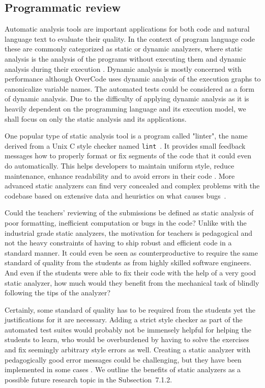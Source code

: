 \subsection{Programmatic review}

Automatic analysis tools are important applications for both code and natural language text to evaluate their quality. In the context of program language code these are commonly categorized as static or dynamic analyzers, where static analysis is the analysis of the programs without executing them and dynamic analysis during their execution \cite{static-dynamic-hybrid-analysis}. Dynamic analysis is mostly concerned with performance although OverCode uses dynamic analysis of the execution graphs to canonicalize variable names\cite{overcode}. The automated tests could be considered as a form of dynamic analysis. Due to the difficulty of applying dynamic analysis as it is heavily dependent on the programming language and its execution model, we shall focus on only the static analysis and its applications.

One popular type of static analysis tool is a program called "linter", the name derived from a Unix C style checker named \texttt{lint}~\cite{lint-1988}. It provides small feedback messages how to properly format or fix segments of the code that it could even do automatically. This helps developers to maintain uniform style, reduce maintenance, enhance readability and to avoid errors in their code \cite{lint-1988}. More advanced static analyzers can find very concealed and complex problems with the codebase based on extensive data and heuristics on what causes bugs~\cite{fb-static-dynamic-analysis}.

Could the teachers' reviewing of the submissions be defined as static analysis of poor formatting, inefficient computation or bugs in the code? Unlike with the industrial grade static analyzers, the motivation for teachers is pedagogical and not the heavy constraints of having to ship robust and efficient code in a standard manner. It could even be seen as counterproductive to require the same standard of quality from the students as from highly skilled software engineers. And even if the students were able to fix their code with the help of a very good static analyzer, how much would they benefit from the mechanical task of blindly following the tips of the analyzer?

Certainly, some standard of quality has to be required from the students yet the justifications for it are necessary. Adding a strict style checker as part of the automated test suites would probably not be immensely helpful for helping the students to learn, who would be overburdened by having to solve the exercises and fix seemingly arbitrary style errors as well. Creating a static analyzer with pedagogically good error messages could be challenging, but they have been implemented in some cases \cite{static-analyses-in-py-courses, fox-roy-autostyle-msc-2016}. We outline the benefits of static analyzers as a possible future research topic in the Subsection~7.1.2.

